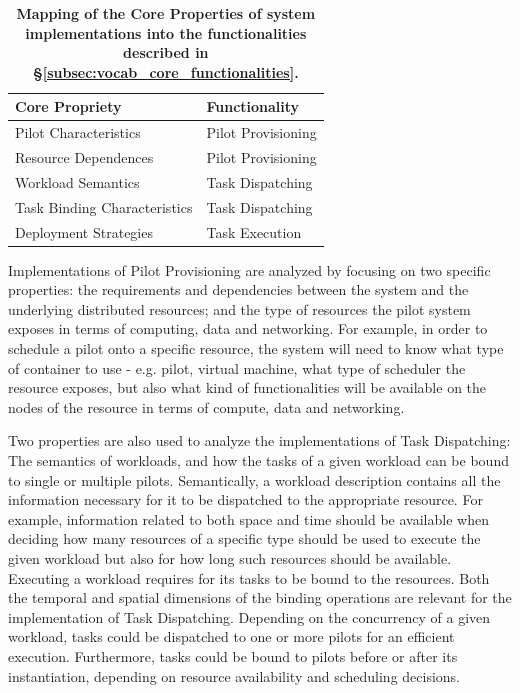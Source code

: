\documentclass{sig-alternate}
\begin{document}
\begin{table}
\centering
 \begin{tabular}{|l|l|}
  \hline
    \textbf{Core Propriety} & \textbf{Functionality} \\ \hline
  \hline
    Pilot Characteristics & Pilot Provisioning \\
  \hline
    Resource Dependences & Pilot Provisioning \\
  \hline
    Workload Semantics & Task Dispatching \\
  \hline
    Task Binding Characteristics & Task Dispatching \\
  \hline
    Deployment Strategies & Task Execution \\ \hline
 \end{tabular}
 \caption{\textbf{Mapping of the Core Properties of \pilotjob system 
                  implementations into the functionalities described in 
                  \S\ref{subsec:vocab_core_functionalities}.}\up}
 \label{table:core_properties}
\end{table}

Implementations of Pilot Provisioning are analyzed by focusing on two specific
properties: the requirements and dependencies between the \pilotjob system and
the underlying distributed resources; and the type of resources the pilot
system exposes in terms of computing, data and networking. For example, in
order to schedule a pilot onto a specific resource, the \pilotjob system will
need to know what type of container to use - e.g. pilot, virtual machine, what
type of scheduler the resource exposes, but also what kind of functionalities
will be available on the nodes of the resource in terms of compute, data and
networking.


Two properties are also used to analyze the implementations of Task
Dispatching: The semantics of workloads, and how the tasks of a given workload
can be bound to single or multiple pilots. Semantically, a workload description
contains all the information necessary for it to be dispatched to the
appropriate resource. For example, information related to both space and time
should be available when deciding how many resources of a specific type should
be used to execute the given workload but also for how long such resources
should be available. Executing a workload requires for its tasks to be bound to
the resources. Both the temporal and spatial dimensions of the binding
operations are relevant for the implementation of Task Dispatching. Depending
on the concurrency of a given workload, tasks could be dispatched to one or
more pilots for an efficient execution. Furthermore, tasks could be bound to
pilots before or after its instantiation, depending on resource availability
and scheduling decisions.
\end{document}
